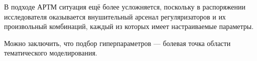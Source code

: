 В подходе АРТМ ситуация ещё более усложняется, поскольку в распоряжении исследователя оказывается внушительный арсенал регуляризаторов и их произвольный комбинаций, каждый из которых имеет настраиваемые параметры.

Можно заключить, что подбор гиперпараметров --- болевая точка области тематического моделирования.


